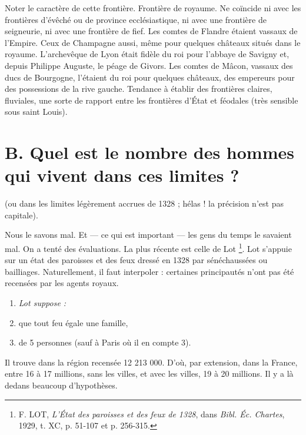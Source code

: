 \documentclass[french,twoside]{book} %
\newlength{\listmod}
\newcommand{\listhead}[1]{\hspace{-1\listmod}\emph{#1}}
\begin{document}
\begin{enumerate}[itemsep=0pt,]
\end{enumerate}\noindent Noter le caractère de cette frontière. Frontière de royaume. Ne coïncide ni avec les frontières d’évêché ou de province ecclésiastique, ni avec une frontière de seigneurie, ni avec une frontière de fief. Les comtes de Flandre étaient vassaux de l’Empire. Ceux de Champagne aussi, même pour quelques châteaux situés dans le royaume. L’archevêque de Lyon était fidèle du roi pour l’abbaye de Savigny et, depuis Philippe Auguste, le péage de Givors. Les comtes de Mâcon, vassaux des ducs de Bourgogne, l’étaient du roi pour quelques châteaux, des empereurs pour des possessions de la rive gauche. Tendance à établir des frontières claires, fluviales, une sorte de rapport entre les frontières d’État et féodales (très sensible sous saint Louis).
\section[B. Quel est le nombre des hommes qui vivent dans ces limites ?]{B. Quel est le nombre des hommes qui vivent dans ces limites ?}
\label{c02b}
\noindent (ou dans les limites légèrement accrues de 1328 ; hélas ! la précision n’est pas capitale).\par
Nous le savons mal. Et — ce qui est important — les gens du temps le savaient mal. On a tenté des évaluations. La plus récente est celle de Lot \footnote{F. LOT, {\itshape L’État des paroisses et des feux de 1328}, dans {\itshape Bibl. Éc. Chartes}, 1929, t. XC, p. 51-107 et p. 256-315.}. Lot s’appuie sur un état des paroisses et des feux dressé en 1328 par sénéchaussées ou bailliages. Naturellement, il faut interpoler : certaines principautés n’ont pas été recensées par les agents royaux.\par

\begin{enumerate}[itemsep=0pt,]
\item[]\listhead{Lot suppose :}
\item que tout feu égale une famille,
\item de 5 personnes (sauf à Paris où il en compte 3).

\end{enumerate}\noindent Il trouve dans la région recensée 12 213 000. D’où, par extension, dans la France, entre 16 à 17 millions, sans les villes, et avec les villes, 19 à 20 millions. Il y a là dedans beaucoup d’hypothèses.\par
\end{document}
